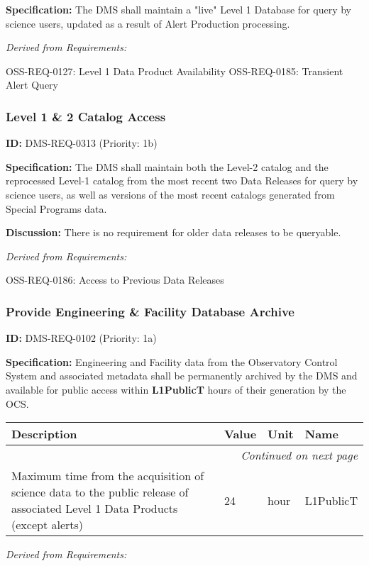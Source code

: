 \documentclass[SE,toc,lsstdraft]{lsstdoc}
\makeatletter
\newcommand{\paramname}[1]{\hspace{0pt}#1}
\newcommand{\unitname}[1]{\hspace{0pt}#1}
\newenvironment{parameters}[0]{%
\setlength\LTleft{0pt}
\setlength\LTright{\fill}
\begin{small}
\begin{longtable}[]{|p{0.49\textwidth}|l|p{0.6in}|p{1.70in}@{}|}

\hline \textbf{Description} & \textbf{Value} & \textbf{Unit} & \textbf{Name} \\ \hline
\endhead

\hline \multicolumn{4}{r}{\emph{Continued on next page}} \\
\endfoot

\hline\hline
\endlastfoot
}{%
\hline
\end{longtable}
\end{small}
}
\makeatother
\begin{document}
\textbf{Specification:} The DMS shall maintain a "live" Level 1 Database for query by science users, updated as a result of Alert Production processing.

\emph{Derived from Requirements:}

OSS-REQ-0127:
Level 1 Data Product Availability \newline
OSS-REQ-0185:
Transient Alert Query \newline

\subsubsection{Level 1 \& 2 Catalog Access}

\label{DMS-REQ-0313}
\textbf{ID:} DMS-REQ-0313 (Priority: 1b)

\textbf{Specification:} The DMS shall maintain both the Level-2 catalog and the reprocessed Level-1 catalog from the most recent two Data Releases for query by science users, as well as versions of the most recent catalogs generated from Special Programs data.

\textbf{Discussion: }There is no requirement for older data releases to be queryable.

\emph{Derived from Requirements:}

OSS-REQ-0186:
Access to Previous Data Releases \newline

\subsubsection{Provide Engineering \& Facility Database Archive}

\label{DMS-REQ-0102}
\textbf{ID:} DMS-REQ-0102 (Priority: 1a)

\textbf{Specification:} Engineering and Facility data from the Observatory Control System and associated metadata shall be permanently archived by the DMS and available for public access within \textbf{L1PublicT} hours of their generation by the OCS.

\begin{parameters}
Maximum time from the acquisition of science data to the public release of associated Level 1 Data Products (except alerts)
&
24
&
\unitname{%
hour
}
&
\paramname{%
L1PublicT
} \\\hline
\end{parameters}

\emph{Derived from Requirements:}
\end{document}
